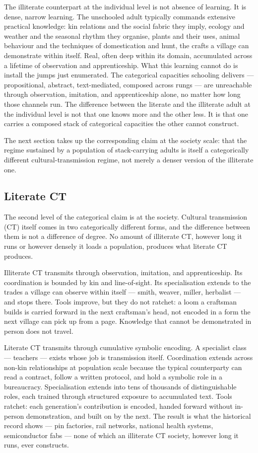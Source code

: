 \documentclass[12pt,letterpaper]{article}
\begin{document}
The illiterate counterpart at the individual level is not absence
of learning. It is dense, narrow learning. The unschooled adult
typically commands extensive practical knowledge: kin relations and
the social fabric they imply, ecology and weather and the seasonal
rhythm they organise, plants and their uses, animal behaviour and
the techniques of domestication and hunt, the crafts a village can
demonstrate within itself. Real, often deep within its domain,
accumulated across a lifetime of observation and apprenticeship.
What this learning cannot do is install the jumps just enumerated.
The categorical capacities schooling delivers --- propositional,
abstract, text-mediated, composed across rungs --- are unreachable
through observation, imitation, and apprenticeship alone, no matter
how long those channels run. The difference between the literate
and the illiterate adult at the individual level is not that one
knows more and the other less. It is that one carries a composed
stack of categorical capacities the other cannot construct.

The next section takes up the corresponding claim at the society
scale: that the regime sustained by a population of stack-carrying
adults is itself a categorically different cultural-transmission
regime, not merely a denser version of the illiterate one.

\subsection{Literate CT}\label{literate-ct}

The second level of the categorical claim is at the society. Cultural
transmission (CT) itself comes in two categorically different forms,
and the difference between them is not a difference of degree. No
amount of illiterate CT, however long it runs or however densely it
loads a population, produces what literate CT produces.

Illiterate CT transmits through observation, imitation, and
apprenticeship. Its coordination is bounded by kin and line-of-sight.
Its specialisation extends to the trades a village can observe within
itself --- smith, weaver, miller, herbalist --- and stops there.
Tools improve, but they do not ratchet: a loom a craftsman builds is
carried forward in the next craftsman's head, not encoded in a form
the next village can pick up from a page. Knowledge that cannot be
demonstrated in person does not travel.

Literate CT transmits through cumulative symbolic encoding. A
specialist class --- teachers --- exists whose job is transmission
itself. Coordination extends across non-kin relationships at
population scale because the typical counterparty can read a
contract, follow a written protocol, and hold a symbolic role in a
bureaucracy. Specialisation extends into tens of thousands of
distinguishable roles, each trained through structured exposure to
accumulated text. Tools ratchet: each generation's contribution is
encoded, handed forward without in-person demonstration, and built on
by the next. The result is what the historical record shows --- pin
factories, rail networks, national health systems, semiconductor fabs
--- none of which an illiterate CT society, however long it runs,
ever constructs.
\end{document}
